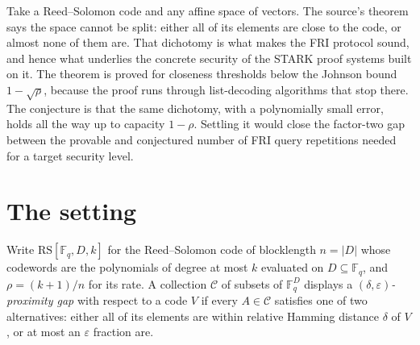 \documentclass{aicr-conjecture}
\newcommand{\F}{\mathbb{F}}
\newcommand{\eps}{\varepsilon}
\newcommand{\RS}{\mathrm{RS}}
\begin{document}

\vspace{0.4em}

\begin{informalconjecture}
Take a Reed--Solomon code and any affine space of vectors. The source's
theorem says the space cannot be split: either all of its elements are
close to the code, or almost none of them are. That dichotomy is what
makes the FRI protocol sound, and hence what underlies the concrete
security of the STARK proof systems built on it. The theorem is proved
for closeness thresholds below the Johnson bound $1 - \sqrt{\rho}$,
because the proof runs through list-decoding algorithms that stop there.
The conjecture is that the same dichotomy, with a polynomially small
error, holds all the way up to capacity $1 - \rho$. Settling it would
close the factor-two gap between the provable and conjectured number of
FRI query repetitions needed for a target security level.
\end{informalconjecture}

\section{The setting}\label{sec:setting}

Write $\RS[\F_{q}, D, k]$ for the Reed--Solomon code of blocklength $n =
|D|$ whose codewords are the polynomials of degree at most $k$ evaluated
on $D \subseteq \F_{q}$, and $\rho = (k+1)/n$ for its rate. A collection
$\mathcal{C}$ of subsets of $\F_{q}^{D}$ displays a
\emph{$(\delta,\eps)$-proximity gap} with respect to a code $V$ if every
$A \in \mathcal{C}$ satisfies one of two alternatives: either all of its
elements are within relative Hamming distance $\delta$ of $V$, or at most
an $\eps$ fraction are.
\end{document}

